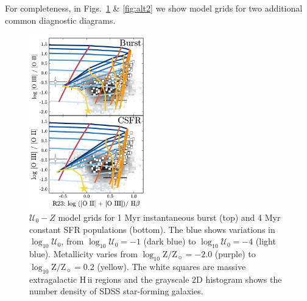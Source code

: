 \documentclass[linenumbers, trackchanges, tighten]{aastex61}%
\newcommand{\logten}{\ensuremath{\log_{10}}}
\newcommand{\hii}{H\,{\sc ii}\xspace}
\newcommand{\logZeq}[1]{\ensuremath{\logten \mathrm{Z}/\mathrm{Z}_{\sun} = #1}}
\newcommand{\U}{\ensuremath{\mathcal{U}_{0}}}
\newcommand{\logU}{\ensuremath{\logten \mathcal{U}_0}}
\begin{document}
For completeness, in Figs.~\ref{fig:alt1} \& \ref{fig:alt2} we show model grids for two additional common diagnostic diagrams.
\begin{figure}[!htbp]
  \begin{centering}
    \includegraphics[width=0.45\textwidth]{f21.pdf}
    \caption{$\U-Z$ model grids for 1 Myr instantaneous burst (top) and 4 Myr constant SFR populations (bottom). The blue shows variations in \logU{}, from $\logU{}=-1$ (dark blue) to $\logU{}=-4$ (light blue). Metallicity varies from \logZeq{-2.0} (purple) to \logZeq{0.2} (yellow). The white squares are massive extragalactic \hii regions and the grayscale 2D histogram shows the number density of SDSS star-forming galaxies.}
    \label{fig:alt1}
  \end{centering}
\end{figure}
\end{document}
